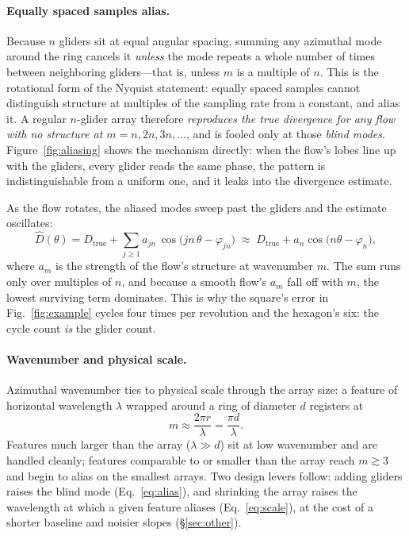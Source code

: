 \documentclass[11pt]{article}
\newcommand{\Dhat}{\widehat{D}}
\begin{document}
\paragraph{Equally spaced samples alias.} Because $n$ gliders sit at equal angular spacing,
summing any azimuthal mode around the ring cancels it \emph{unless} the mode repeats a whole
number of times between neighboring gliders---that is, unless $m$ is a multiple of $n$. This is
the rotational form of the Nyquist statement: equally spaced samples cannot distinguish
structure at multiples of the sampling rate from a constant, and alias it. A regular $n$-glider
array therefore \emph{reproduces the true divergence for any flow with no structure at
$m=n,2n,3n,\dots$}, and is fooled only at those \emph{blind modes}. Figure~\ref{fig:aliasing}
shows the mechanism directly: when the flow's lobes line up with the gliders, every glider reads
the same phase, the pattern is indistinguishable from a uniform one, and it leaks into the
divergence estimate.

As the flow rotates, the aliased modes sweep past the gliders and the estimate oscillates:
\begin{equation}
  \Dhat(\theta)=D_{\text{true}}+\sum_{j\ge1} a_{jn}\,\cos\!\big(jn\,\theta-\varphi_{jn}\big)
  \;\approx\; D_{\text{true}}+a_{n}\cos\!\big(n\theta-\varphi_n\big),
  \label{eq:alias}
\end{equation}
where $a_m$ is the strength of the flow's structure at wavenumber $m$. The sum runs only over
multiples of $n$, and because a smooth flow's $a_m$ fall off with $m$, the lowest surviving term
dominates. This is why the square's error in Fig.~\ref{fig:example} cycles four times per
revolution and the hexagon's six: the cycle count \emph{is} the glider count.

\medskip
\noindent{}

\paragraph{Wavenumber and physical scale.} Azimuthal wavenumber ties to physical scale through
the array size: a feature of horizontal wavelength $\lambda$ wrapped around a ring of diameter
$d$ registers at
\begin{equation}
  m\approx \frac{2\pi r}{\lambda}=\frac{\pi d}{\lambda}.
  \label{eq:scale}
\end{equation}
Features much larger than the array ($\lambda\gg d$) sit at low wavenumber and are handled
cleanly; features comparable to or smaller than the array reach $m\gtrsim3$ and begin to alias
on the smallest arrays. Two design levers follow: adding gliders raises the blind mode
(Eq.~\ref{eq:alias}), and shrinking the array raises the wavelength at which a given feature
aliases (Eq.~\ref{eq:scale}), at the cost of a shorter baseline and noisier slopes
(\S\ref{sec:other}).
\end{document}
